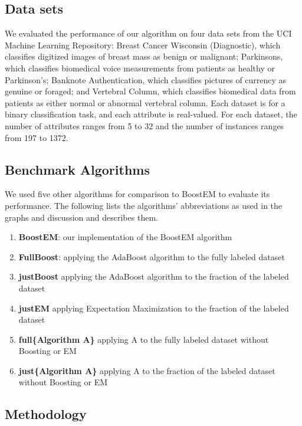 \documentclass{sig-alternate}
\begin{document}
\subsection{Data sets}

We evaluated the performance of our algorithm on four data sets from the UCI Machine Learning Repository: Breast Cancer Wisconsin (Diagnostic), which classifies digitized images of breast mass as benign or malignant; Parkinsons, which classifies biomedical voice measurements from patients as healthy or Parkinson's; Banknote Authentication, which classifies pictures of currency as genuine or foraged; and Vertebral Column, which classifies biomedical data from patients as either normal or abnormal vertebral column. Each dataset is for a binary classification task, and each attribute is real-valued. For each dataset, the number of attributes ranges from 5 to 32 and the number of instances ranges from 197 to 1372. 

\subsection{Benchmark Algorithms}

We used five other algorithms for comparison to BoostEM to evaluate its performance. The following lists the algorithms' abbreviations as used in the graphs and discussion and describes them.

\begin{enumerate}
\item \textbf{BoostEM}: our implementation of the BoostEM algorithm
\item \textbf{FullBoost}: applying the AdaBoost algorithm to the fully labeled dataset
\item \textbf{justBoost} applying the AdaBoost algorithm to the fraction of the labeled dataset
\item \textbf{justEM} applying Expectation Maximization to the fraction of the labeled dataset
\item \textbf{full\{Algorithm A\}} applying A to the fully labeled dataset without Boosting or EM
\item \textbf{just\{Algorithm A\}} applying A to the fraction of the labeled dataset without Boosting or EM
\end{enumerate}

\subsection{Methodology}
\end{document}

